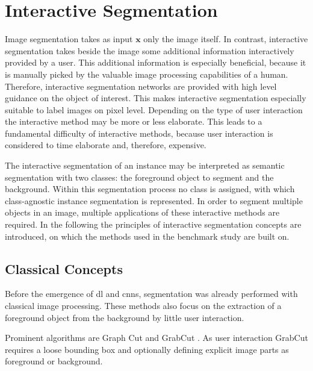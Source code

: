 
\section{Interactive Segmentation}\label{ord:ch2:sec3}

Image segmentation takes as input $\textbf{x}$ only the image itself.
In contrast, interactive segmentation takes beside the image some additional information interactively provided by a user.
This additional information is especially beneficial, because it is manually picked by the valuable image processing capabilities of a human.
Therefore, interactive segmentation networks are provided with high level guidance on the object of interest.
This makes interactive segmentation especially suitable to label images on pixel level.
Depending on the type of user interaction the interactive method may be more or less elaborate.
This leads to a fundamental difficulty of interactive methods, because user interaction is considered to time elaborate and, therefore, expensive.

The interactive segmentation of an instance may be interpreted as semantic segmentation with two classes: the foreground object to segment and the background.
Within this segmentation process no class is assigned, with which class-agnostic instance segmentation is represented.
In order to segment multiple objects in an image, multiple applications of these interactive methods are required.
In the following the principles of interactive segmentation concepts are introduced, on which the methods used in the benchmark study are built on.

\subsection{Classical Concepts}\label{ord:ch2:sec3:subsec1}
Before the emergence of \gls{dl} and \glspl{cnn}, segmentation was already performed with classical image processing.
These methods also focus on the extraction of a foreground object from the background by little user interaction.

Prominent algorithms are Graph Cut \cite{BJ01-GraphCut} and GrabCut \cite{RKB04-GrabCut}.
As user interaction GrabCut requires a loose bounding box and optionally defining explicit image parts as foreground or background.

